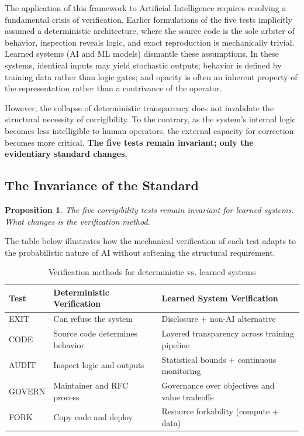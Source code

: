 \documentclass{article}
\newtheorem{proposition}{Proposition}
\begin{document}
The application of this framework to Artificial Intelligence requires resolving a fundamental crisis of verification. Earlier formulations of the five tests implicitly assumed a deterministic architecture, where the source code is the sole arbiter of behavior, inspection reveals logic, and exact reproduction is mechanically trivial. Learned systems (AI and ML models) dismantle these assumptions. In these systems, identical inputs may yield stochastic outputs; behavior is defined by training data rather than logic gates; and opacity is often an inherent property of the representation rather than a contrivance of the operator.

However, the collapse of deterministic transparency does not invalidate the structural necessity of corrigibility. To the contrary, as the system's internal logic becomes less intelligible to human operators, the external capacity for correction becomes more critical. \textbf{The five tests remain invariant; only the evidentiary standard changes.}

\subsection{The Invariance of the Standard}

\begin{proposition}
The five corrigibility tests remain invariant for learned systems. What changes is the verification method.
\end{proposition}

The table below illustrates how the mechanical verification of each test adapts to the probabilistic nature of AI without softening the structural requirement.

\begin{table}[htbp]
\centering
\begin{tabular}{@{}lll@{}}
\toprule
\textbf{Test} & \textbf{Deterministic Verification} & \textbf{Learned System Verification} \\
\midrule
EXIT & Can refuse the system & Disclosure + non-AI alternative \\
CODE & Source code determines behavior & Layered transparency across training pipeline \\
AUDIT & Inspect logic and outputs & Statistical bounds + continuous monitoring \\
GOVERN & Maintainer and RFC process & Governance over objectives and value tradeoffs \\
FORK & Copy code and deploy & Resource forkability (compute + data) \\
\bottomrule
\end{tabular}
\caption{Verification methods for deterministic vs. learned systems}
\end{table}
\end{document}
